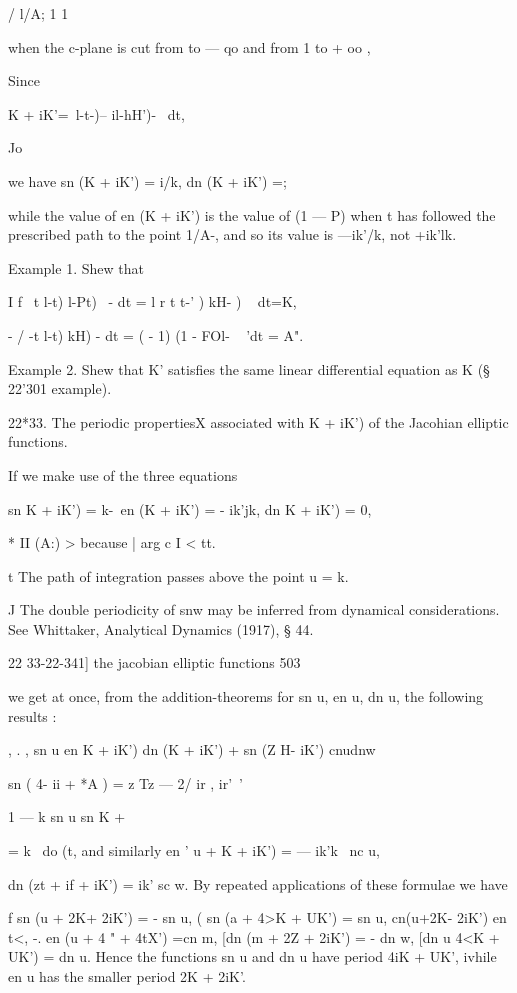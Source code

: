/ l/A; 1 1

when the c-plane is cut from to — qo and from 1 to + oo ,

Since

K + iK'=\ l-t-)-- il-hH')- ~dt,

Jo

we have sn (K + iK') = i/k, dn (K + iK') =;

while the value of en (K + iK') is the value of (1 — P) when t has
followed the prescribed path to the point 1/A-, and so its value is
—ik'/k, not +ik'lk.

Example 1. Shew that

I f \ t l-t) l-Pt) ~- dt = l r t t-' ) kH- ) ~ dt=K,

- / -t l-t) kH) - dt = ( - 1) (1 - FOl- ~ 'dt = A".

Example 2. Shew that K' satisfies the same linear differential
equation as K (§ 22'301 example).

22*33. The periodic propertiesX associated with K + iK') of the
Jacohian elliptic functions.

If we make use of the three equations

sn K + iK') = k-\ en (K + iK') = - ik'jk, dn K + iK') = 0,

* II (A:) > because | arg c I < tt.

t The path of integration passes above the point u = k.

J The double periodicity of snw may be inferred from dynamical
considerations. See Whittaker, Analytical Dynamics (1917), § 44.

22 33-22-341] the jacobian elliptic functions 503

we get at once, from the addition-theorems for sn u, en u, dn u, the
following results :

, . , sn u en K + iK') dn (K + iK') + sn (Z H- iK') cnudnw

sn ( 4- ii + *A ) = z Tz — 2/ ir , ir'\ '

  1 — k sn u sn K +%

= k~ do (t, and similarly en ' u + K + iK') = — ik'k~ nc u,

dn (zt + if + iK') = ik' sc w. By repeated applications of these
formulae we have

f sn (u + 2K+ 2iK') = - sn u, ( sn (a + 4>K + UK') = sn u, cn(u+2K-
2iK') en t<, -. en (u + 4 " + 4tX') =cn m, [dn (m + 2Z + 2iK') = - dn
w, [dn u 4<K + UK') = dn u. Hence the functions sn u and dn u have
period 4iK + UK', ivhile en u has the smaller period 2K + 2iK'.

